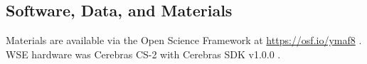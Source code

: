 \subsection{Software, Data, and Materials} \label{sec:materials}

Materials are available via the Open Science Framework at \url{https://osf.io/ymaf8} \cite{foster2017open}.
WSE hardware was Cerebras CS-2 with Cerebras SDK v1.0.0 \cite{buitrago2021neocortex}.



